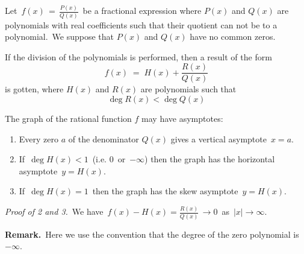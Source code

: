 \documentclass[12pt]{article}
\theoremstyle{definition}
\begin{document}
Let \,$f(x) \,=\, \frac{P(x)}{Q(x)}$\, be a fractional expression where $P(x)$ and $Q(x)$ are polynomials with real coefficients such that their quotient can not be  to a polynomial. \,We suppose that $P(x)$ and $Q(x)$ have no common zeros.

If the division of the polynomials is performed, then a result of the form
               $$f(x) \;=\; H(x)+\frac{R(x)}{Q(x)}$$
is gotten, where $H(x)$ and $R(x)$ are polynomials such that 
                 $$\deg{R(x)} < \deg{Q(x)}$$

The graph of the rational function $f$ may have asymptotes:
\begin{enumerate}
\item Every zero $a$ of the denominator $Q(x)$ gives a vertical asymptote 
 \,$x = a$.
\item If \,$\deg{H(x)} < 1$\, (i.e. $0$\, or\, $-\infty$) then the graph has the horizontal asymptote 
 \,$y = H(x)$.
\item If \,$\deg{H(x)} = 1$\, then the graph has the skew asymptote \,$y = H(x)$.
\end{enumerate}

{\em Proof of 2 and 3.} \,We have
 \,$\displaystyle f(x)\!-\!H(x) = \frac{R(x)}{Q(x)}\,\to 0$\;\, as \;\,$|x|\to\infty$.

\textbf{Remark.} \,Here we use the convention that the degree of the zero polynomial is \,$-\infty$.
\end{document}
